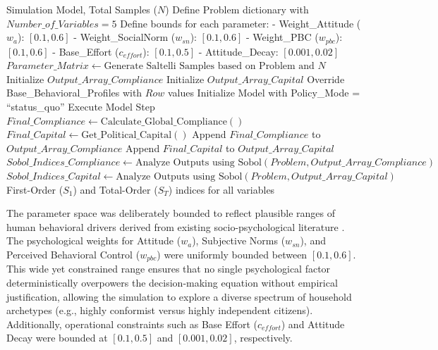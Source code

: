\begin{algorithm}[H]
\caption{Global Sensitivity Analysis (Sobol Method)}
\label{alg:sobol_gsa}
\begin{algorithmic}[1]
\renewcommand{\algorithmicrequire}{\textbf{Input:}}
\Require Simulation Model, Total Samples ($N$)
\Statex
\State {}
\State Define Problem dictionary with $Number\_of\_Variables = 5$
\State Define bounds for each parameter:
\State \quad - Weight\_Attitude ($w_a$): $[0.1, 0.6]$
\State \quad - Weight\_SocialNorm ($w_{sn}$): $[0.1, 0.6]$
\State \quad - Weight\_PBC ($w_{pbc}$): $[0.1, 0.6]$
\State \quad - Base\_Effort ($c_{effort}$): $[0.1, 0.5]$
\State \quad - Attitude\_Decay: $[0.001, 0.02]$
\Statex
\State {}
\State $Parameter\_Matrix \gets \text{Generate Saltelli Samples based on Problem and } N$
\State Initialize $Output\_Array\_Compliance$
\State Initialize $Output\_Array\_Capital$
\Statex
\State {}
    \State Override Base\_Behavioral\_Profiles with $Row$ values
    \State Initialize Model with Policy\_Mode = ``status\_quo''
    \Statex
        \State Execute Model Step
    \EndWhile
    \Statex
    \State {}
    \State $Final\_Compliance \gets \text{Calculate\_Global\_Compliance}()$
    \State $Final\_Capital \gets \text{Get\_Political\_Capital}()$
    \Statex
    \State Append $Final\_Compliance$ to $Output\_Array\_Compliance$
    \State Append $Final\_Capital$ to $Output\_Array\_Capital$
\EndFor
\Statex
\State {}
\State $Sobol\_Indices\_Compliance \gets \text{Analyze Outputs using Sobol}(Problem, Output\_Array\_Compliance)$
\State $Sobol\_Indices\_Capital \gets \text{Analyze Outputs using Sobol}(Problem, Output\_Array\_Capital)$
\Statex
\State \Return First-Order ($S_1$) and Total-Order ($S_T$) indices for all variables
\end{algorithmic}
\end{algorithm}



The parameter space was deliberately bounded to reflect plausible ranges of human behavioral drivers derived from existing socio-psychological literature \citep{Meng2018}. The psychological weights for Attitude ($w_a$), Subjective Norms ($w_{sn}$), and Perceived Behavioral Control ($w_{pbc}$) were uniformly bounded between $[0.1, 0.6]$. This wide yet constrained range ensures that no single psychological factor deterministically overpowers the decision-making equation without empirical justification, allowing the simulation to explore a diverse spectrum of household archetypes (e.g., highly conformist versus highly independent citizens). Additionally, operational constraints such as Base Effort ($c_{effort}$) and Attitude Decay were bounded at $[0.1, 0.5]$ and $[0.001, 0.02]$, respectively. 


